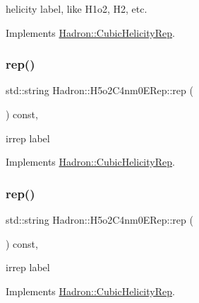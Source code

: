 helicity label, like H1o2, H2, etc. 

Implements \mbox{\hyperlink{structHadron_1_1CubicHelicityRep_af1096946b7470edf0a55451cc662f231}{Hadron\+::\+Cubic\+Helicity\+Rep}}.

\mbox{\label{structHadron_1_1H5o2C4nm0ERep_a72959e5415b9a2c1a841e0c35b4c1045}} 
\subsubsection{\texorpdfstring{rep()}{rep()}\hspace{0.1cm}{\footnotesize\ttfamily [1/2]}}
{\footnotesize\ttfamily std\+::string Hadron\+::\+H5o2\+C4nm0\+E\+Rep\+::rep (\begin{DoxyParamCaption}{ }\end{DoxyParamCaption}) const\hspace{0.3cm}{\ttfamily [inline]}, {\ttfamily [virtual]}}

irrep label 

Implements \mbox{\hyperlink{structHadron_1_1CubicHelicityRep_a8cdd86f068a167dc96faef02bfb8a33d}{Hadron\+::\+Cubic\+Helicity\+Rep}}.

\mbox{\label{structHadron_1_1H5o2C4nm0ERep_a72959e5415b9a2c1a841e0c35b4c1045}} 
\subsubsection{\texorpdfstring{rep()}{rep()}\hspace{0.1cm}{\footnotesize\ttfamily [2/2]}}
{\footnotesize\ttfamily std\+::string Hadron\+::\+H5o2\+C4nm0\+E\+Rep\+::rep (\begin{DoxyParamCaption}{ }\end{DoxyParamCaption}) const\hspace{0.3cm}{\ttfamily [inline]}, {\ttfamily [virtual]}}

irrep label 

Implements \mbox{\hyperlink{structHadron_1_1CubicHelicityRep_a8cdd86f068a167dc96faef02bfb8a33d}{Hadron\+::\+Cubic\+Helicity\+Rep}}.

\mbox{\label{structHadron_1_1H5o2C4nm0ERep_a3f459ff8e7a5af2e24b6bc9b86d70a87}} 
